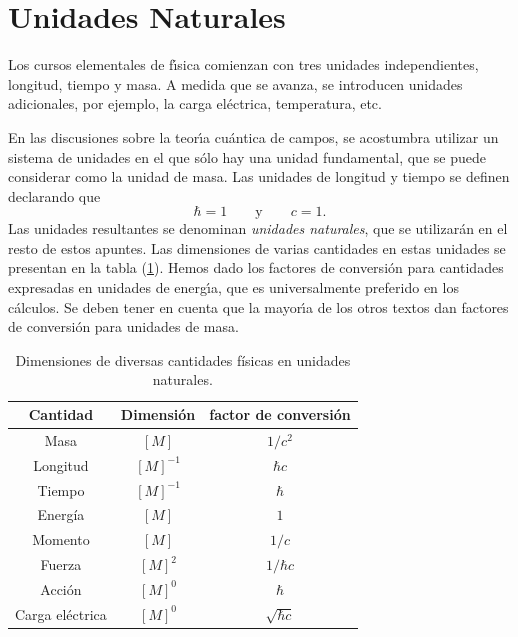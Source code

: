 \section{Unidades Naturales}

Los cursos elementales de f\'{\i}sica comienzan con tres unidades
independientes, longitud, tiempo y masa. A medida que se avanza, se
introducen unidades adicionales, por ejemplo, la carga el\'{e}ctrica,
temperatura, etc.

En las discusiones sobre la teor\'{\i}a cu\'{a}ntica de campos, se
acostumbra utilizar un sistema de unidades en el que s\'{o}lo hay una unidad
fundamental, que se puede considerar como la unidad de masa. Las unidades de
longitud y tiempo se definen declarando que
\begin{equation}
\hbar =1\qquad \text{y}\qquad c=1  \label{40}.
\end{equation}
Las unidades resultantes se denominan \emph{unidades naturales}, que se
utilizar\'{a}n en el resto de estos apuntes. Las dimensiones de varias
cantidades en estas unidades se presentan en la tabla (\ref{tab:table1}). Hemos
dado los factores de conversi\'{o}n para cantidades expresadas en unidades
de energ\'{\i}a, que es universalmente preferido en los c\'{a}lculos. Se
deben tener en cuenta que la mayor\'{\i}a de los otros textos dan factores
de conversi\'{o}n para unidades de masa.

\begin{table}[h!]
\renewcommand{\tablename}{Tabla}
\begin{center}
\begin{tabular}{ c | c | c }
\hline \hline
Cantidad & Dimensión &  factor de conversión\\ \hline \hline
Masa & $\left[M \right]$ & $1/c^{2}$\\
Longitud & $\left[M \right]^{-1}$ & $\hbar c$\\
Tiempo & $\left[M \right]^{-1}$ & $\hbar$\\ 
Energía & $\left[M \right]$ & $1$\\	
Momento & $\left[M \right]$ & $1/c$\\
Fuerza & $\left[M \right]^{2}$ & $1/\hbar c$\\
Acción & $\left[M \right]^{0}$ & $\hbar$\\
Carga eléctrica & $\left[M \right]^{0}$ & $\sqrt{\hbar c}$\\ \hline \hline
\end{tabular}
\caption{Dimensiones de diversas cantidades físicas en unidades naturales.}
\label{tab:table1}
\end{center}
\end{table}

